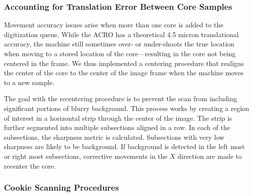 \documentclass[a4paper,12pt]{article}
\begin{document}
\subsubsection{Accounting for Translation Error Between Core Samples}

Movement accuracy issues arise when more than one core is added to the digitization queue.
While the ACRO has a theoretical 4.5 micron translational accuracy, the machine still sometimes over- or under-shoots the true location when moving to a stored location of the core---resulting in the core not being centered in the frame.
We thus implemented a centering procedure that realigns the center of the core to the center of the image frame when the machine moves 
to a new sample. 

The goal with the recentering procedure is to prevent the scan from including significant portions of blurry background.
This process works by creating a region of interest in a horizontal strip through the center of the image. The strip is further segmented into multiple subsections aligned in a row.
In each of the subsections, the sharpness metric is calculated. Subsections with very low sharpness are likely to be background.
If background is detected in the left most or right most subsections, corrective movements in the $X$ direction are made to recenter the core.


\subsubsection{Cookie Scanning Procedures}  
\end{document}
